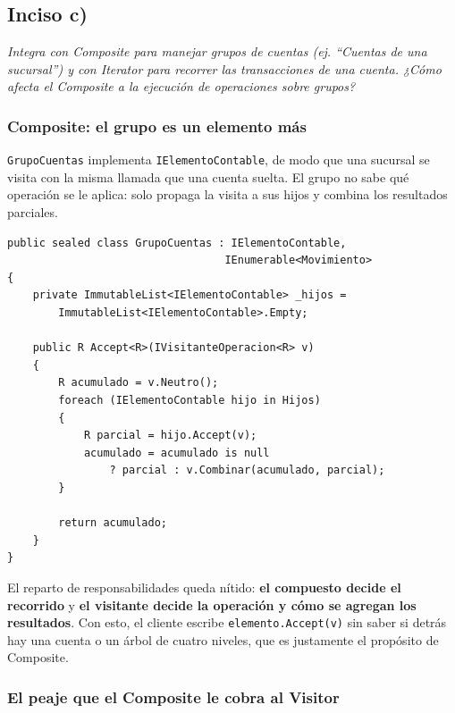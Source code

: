 {}
\subsection*{Inciso c)}

\sloppy

\textit{Integra con Composite para manejar grupos de cuentas (ej. ``Cuentas de una sucursal'')
y con Iterator para recorrer las transacciones de una cuenta. ¿Cómo afecta el Composite a la
ejecución de operaciones sobre grupos?}

\vspace{0.4cm}

\subsubsection*{Composite: el grupo es un elemento más}

\texttt{GrupoCuentas} implementa \texttt{IElementoContable}, de modo que una sucursal se visita
con la misma llamada que una cuenta suelta. El grupo no sabe qué operación se le aplica: solo
propaga la visita a sus hijos y combina los resultados parciales.

{\small
\begin{verbatim}
public sealed class GrupoCuentas : IElementoContable,
                                  IEnumerable<Movimiento>
{
    private ImmutableList<IElementoContable> _hijos =
        ImmutableList<IElementoContable>.Empty;

    public R Accept<R>(IVisitanteOperacion<R> v)
    {
        R acumulado = v.Neutro();
        foreach (IElementoContable hijo in Hijos)
        {
            R parcial = hijo.Accept(v);
            acumulado = acumulado is null
                ? parcial : v.Combinar(acumulado, parcial);
        }

        return acumulado;
    }
}
\end{verbatim}
}

El reparto de responsabilidades queda nítido: \textbf{el compuesto decide el recorrido} y
\textbf{el visitante decide la operación y cómo se agregan los resultados}. Con esto, el
cliente escribe \texttt{elemento.Accept(v)} sin saber si detrás hay una cuenta o un árbol de
cuatro niveles, que es justamente el propósito de Composite.

\subsubsection*{El peaje que el Composite le cobra al Visitor}

